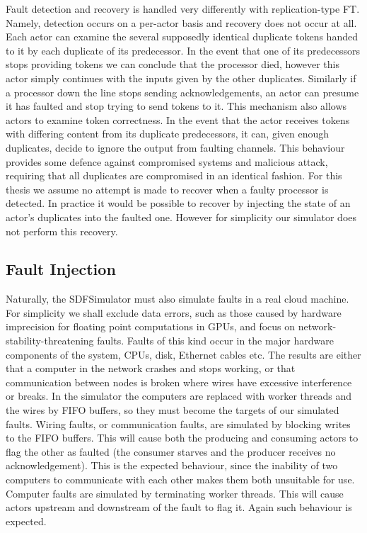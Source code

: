 Fault detection and recovery is handled very differently with replication-type FT.
Namely, detection occurs on a per-actor basis and recovery does not occur at all.
Each actor can examine the several supposedly identical duplicate tokens handed to it by each duplicate of its predecessor.
In the event that one of its predecessors stops providing tokens we can conclude that the processor died, however this actor simply continues with the inputs given by the other duplicates.
Similarly if a processor down the line stops sending acknowledgements, an actor can presume it has faulted and stop trying to send tokens to it.
This mechanism also allows actors to examine token correctness.
In the event that the actor receives tokens with differing content from its duplicate predecessors, it can, given enough duplicates, decide to ignore the output from faulting channels.
This behaviour provides some defence against compromised systems and malicious attack, requiring that all duplicates are compromised in an identical fashion.
For this thesis we assume no attempt is made to recover when a faulty processor is detected.
In practice it would be possible to recover by injecting the state of an actor's duplicates into the faulted one.
However for simplicity our simulator does not perform this recovery.

\subsection{Fault Injection}

Naturally, the SDFSimulator must also simulate faults in a real cloud machine.
For simplicity we shall exclude data errors, such as those caused by hardware imprecision for floating point computations in GPUs, and focus on network-stability-threatening faults.
Faults of this kind occur in the major hardware components of the system, CPUs, disk, Ethernet cables etc.
The results are either that a computer in the network crashes and stops working, or that communication between nodes is broken where wires have excessive interference or breaks.
In the simulator the computers are replaced with worker threads and the wires by FIFO buffers, so they must become the targets of our simulated faults.
Wiring faults, or communication faults, are simulated by blocking writes to the FIFO buffers.
This will cause both the producing and consuming actors to flag the other as faulted (the consumer starves and the producer receives no acknowledgement).
This is the expected behaviour, since the inability of two computers to communicate with each other makes them both unsuitable for use.
Computer faults are simulated by terminating worker threads.
This will cause actors upstream and downstream of the fault to flag it.
Again such behaviour is expected.

